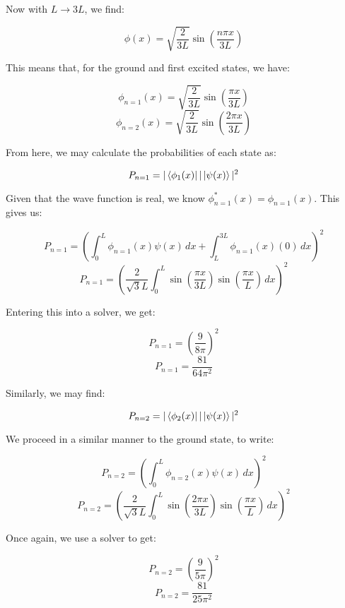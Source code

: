 \begin{enumerate}
    Now with $L\to3L$, we find:

    $$\phi(x)=\sqrt{\frac{2}{3L}}\sin\left( \frac{n\pi x}{3L} \right)$$

    This means that, for the ground and first excited states, we have:

    $$\phi_{n=1}(x)=\sqrt{\frac{2}{3L}}\sin\left( \frac{\pi x}{3L} \right)$$
    $$\phi_{n=2}(x)=\sqrt{\frac{2}{3L}}\sin\left( \frac{2\pi x}{3L} \right)$$

    From here, we may calculate the probabilities of each state as:

    $$P_{n=1}=|\bra{\phi_1(x)}|\ket{\psi(x)}|^2$$

    Given that the wave function is real, we know $\phi_{n=1}^*(x)=\phi_{n=1}(x)$. This gives us:

    $$P_{n=1}=\left( \int_0^L \phi_{n=1}(x)\psi(x)\,dx+\int_{L}^{3L} \phi_{n=1}(x)(0)\,dx \right)^2$$
    $$P_{n=1}=\left( \frac{2}{\sqrt{3}L}\int_0^L \sin\left( \frac{\pi x}{3L} \right)\sin\left( \frac{\pi x}{L} \right)\,dx\right)^2$$

    Entering this into a solver, we get:

    $$P_{n=1}=\left( \frac{9}{8\pi}\right)^2$$
    $$\boxed{P_{n=1}=\frac{81}{64\pi^2}}$$

    Similarly, we may find:

    $$P_{n=2}=|\bra{\phi_2(x)}|\ket{\psi(x)}|^2$$

    We proceed in a similar manner to the ground state, to write:

    $$P_{n=2}=\left( \int_0^L \phi_{n=2}(x)\psi(x)\,dx\right)^2$$
    $$P_{n=2}=\left( \frac{2}{\sqrt{3}L}\int_0^L \sin\left( \frac{2\pi x}{3L} \right)\sin\left( \frac{\pi x}{L} \right)\,dx\right)^2$$

    Once again, we use a solver to get:

    $$P_{n=2}=\left( \frac{9}{5\pi}\right)^2$$
    $$\boxed{P_{n=2}=\frac{81}{25\pi^2}}$$

\end{enumerate}



